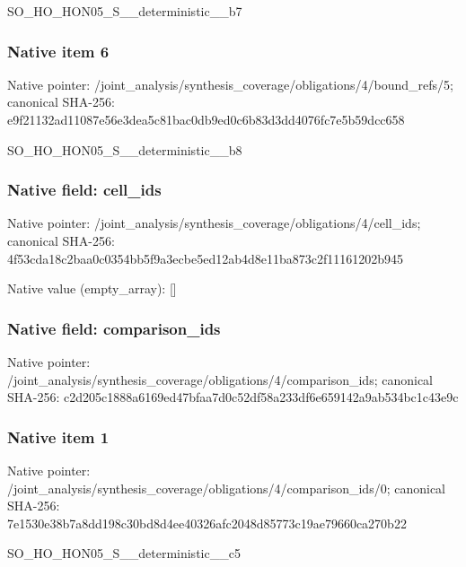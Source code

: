 \documentclass[10pt,a4paper]{article}
\begin{document}
\begingroup\raggedright\sloppy SO\_\allowbreak{}HO\_\allowbreak{}HON05\_\allowbreak{}S\_\allowbreak{}\_\allowbreak{}deterministic\_\allowbreak{}\_\allowbreak{}b7\par\endgroup

\subsubsection{Native item 6}
Native pointer: /joint\_\allowbreak{}analysis/synthesis\_\allowbreak{}coverage/obligations/4/bound\_\allowbreak{}refs/5; canonical SHA-256: e9f21132ad11087e56e3dea5c81bac0db9ed0c6b83d3dd4076fc7e5b59dcc658

\begingroup\raggedright\sloppy SO\_\allowbreak{}HO\_\allowbreak{}HON05\_\allowbreak{}S\_\allowbreak{}\_\allowbreak{}deterministic\_\allowbreak{}\_\allowbreak{}b8\par\endgroup

\subsubsection{Native field: cell\_\allowbreak{}ids}
Native pointer: /joint\_\allowbreak{}analysis/synthesis\_\allowbreak{}coverage/obligations/4/cell\_\allowbreak{}ids; canonical SHA-256: 4f53cda18c2baa0c0354bb5f9a3ecbe5ed12ab4d8e11ba873c2f11161202b945

Native value (empty\_\allowbreak{}array): []

\subsubsection{Native field: comparison\_\allowbreak{}ids}
Native pointer: /joint\_\allowbreak{}analysis/synthesis\_\allowbreak{}coverage/obligations/4/comparison\_\allowbreak{}ids; canonical SHA-256: c2d205c1888a6169ed47bfaa7d0c52df58a233df6e659142a9ab534bc1c43e9c

\subsubsection{Native item 1}
Native pointer: /joint\_\allowbreak{}analysis/synthesis\_\allowbreak{}coverage/obligations/4/comparison\_\allowbreak{}ids/0; canonical SHA-256: 7e1530e38b7a8dd198c30bd8d4ee40326afc2048d85773c19ae79660ca270b22

\begingroup\raggedright\sloppy SO\_\allowbreak{}HO\_\allowbreak{}HON05\_\allowbreak{}S\_\allowbreak{}\_\allowbreak{}deterministic\_\allowbreak{}\_\allowbreak{}c5\par\endgroup
\end{document}
